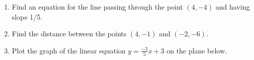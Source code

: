 \documentclass{article}
\begin{document}
\HomeworkTitle[class={College Algebra}, number={3}, name={Lines and Circles}]

\begin{enumerate}
\item Find an equation for the line passing through the point $(4, -4)$ and having slope 1/5. \vspace{5cm}

\item Find the distance between the points $(4, -1)$ and $(-2, -6)$. \vspace{5cm}

\item Plot the graph of the linear equation $y = \frac{-3}{5} x + 3$ on the plane below.\begin{center}
\CartesianPlane[h=7,w=7,axes=yes]
\end{center}

  
\end{enumerate}
\end{document}
